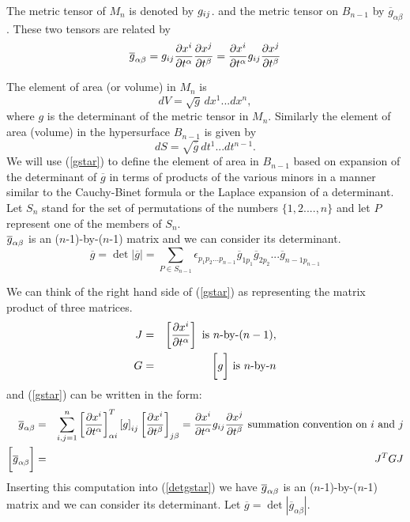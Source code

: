 The metric tensor of $M_n$ is denoted by $g_{ij}$. and the metric tensor on $B_{n-1}$ by $\overline{g}_{\alpha\beta}$. These two tensors are related by
\begin{equation}
 \overline{g}_{\alpha\beta}= g_{ij} {\partial x^i\over \partial t^\alpha} {\partial x^j\over \partial t^\beta} = {\partial x^i\over \partial t^\alpha} g_{ij} {\partial x^j\over \partial t^\beta} \label{gstar}
\end{equation}

The element of area (or volume) in $M_n$ is 
\begin{equation}
dV = \sqrt{g}\,dx^1...dx^n,\label{areag}
\end{equation}
where $g$ is the determinant of the metric tensor in $M_n$. Similarly the element of area (volume) in the hypersurface $B_{n-1}$ is given by 
\begin{equation}
dS = \sqrt{\overline{g}}\,dt^1...dt^{n-1}.\label{areagstar}
\end{equation} 
We will use (\ref{gstar}) to define the element of area in $B_{n-1}$ based on expansion of the determinant of $\overline{g}$ in terms of products of the various minors in a manner similar to the
Cauchy-Binet formula or the Laplace expansion of a determinant. Let $S_n$ stand for the set of permutations of the numbers $\{1,2....,n \}$ and let $P$ represent one of the members of $S_n$.\\

$\overline{g}_{\alpha\beta}$ is an ($n$-1)-by-($n$-1) matrix and we can consider its determinant. 
\begin{equation}
\overline{g} = \det |\overline{g}| = \sum_{P \in S_{n-1}} \epsilon_{ p_1 p_2 ... p_{n-1}} \overline{g}_{1 p_1}  \overline{g}_{2 p_2} ... \overline{g}_{n-1 p_{n-1}} \label{detgstar}
\end{equation}

We can think of the right hand side of (\ref{gstar}) as representing the matrix product of three matrices. 
\begin{eqnarray*}
J &=&  \left[ {\partial x^i\over \partial t^\alpha} \right] \hbox{~is $n$-by-$(n-1)$},\\ 
G &=&\bigg[ g \bigg] \hbox{~is $n$-by-$n$}
\end{eqnarray*}
 and (\ref{gstar}) can be written in the form:
\begin{eqnarray*}
 \overline{g}_{\alpha\beta} &=& \sum_{i,j=1}^n \left[ {\partial x^i\over \partial t^\alpha} \right]^T_{\alpha i} \left[g\right]_{ij} \left[ {\partial x^i\over \partial t^\beta} \right]_{j\beta} = {\partial x^i\over \partial t^\alpha} g_{ij} {\partial x^j\over \partial t^\beta} \hbox{~summation convention on $i$ and $j$}\\
\bigg[ \overline{g}_{\alpha\beta}\bigg] &=& J^T G J \\
\end{eqnarray*}
Inserting this computation into (\ref{detgstar}) we have
$\overline{g}_{\alpha\beta}$ is an ($n$-1)-by-($n$-1) matrix and we can consider its determinant.  Let $\overline{g} =\det |\overline{g}_{\alpha\beta} |$.

